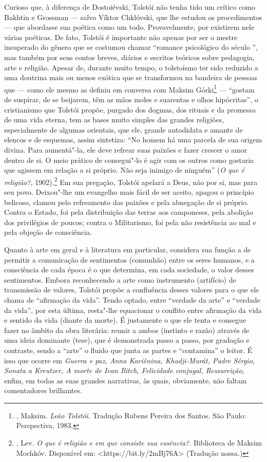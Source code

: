 Curioso que, à diferença de Dostoiévski, Tolstói não tenha tido
um crítico como Bakhtin e Grossman --- salvo Víktor Chklóvski,
que lhe estudou os procedimentos --- que abordasse sua poética
como um todo. Provavelmente, por existirem nele várias poéticas.
De fato, Tolstói é importante não apenas por ser o mestre
insuperado do gênero que se costumou chamar ``romance psicológico
do século '', mas também por seus contos breves,
diários e escritos teóricos sobre pedagogia, arte e religião.
Apesar de, durante muito tempo, o tolstoísmo ter sido reduzido
a uma doutrina mais ou menos exótica que se transformou na
bandeira de pessoas que --- como ele mesmo as definiu em conversa
com Maksim Górki\footnote{, Maksim. \emph{Leão
Tolstói}. Tradução Rubens Pereira dos Santos. São Paulo:
Perspectiva, 1983.} --- ``gostam de suspirar, de se beijarem,
têm as mãos moles e suarentas e olhos hipócritas'', o
cristianismo que Tolstói propõe, purgado dos dogmas, dos
rituais e da promessa de uma vida eterna, tem as bases muito
simples das grandes religiões, especialmente de algumas orientais,
que ele, grande autodidata e amante de elencos e de esquemas,
assim sintetiza: ``No homem há uma parcela de sua origem divina.
Para aumentá"-la, ele deve refrear suas paixões e fazer crescer o
amor dentro de si. O meio prático de consegui"-lo é agir com os
outros como gostaria que agissem em relação a si próprio. Não
seja inimigo de ninguém'' (\emph{O que é religião?},
1902).\footnote{, Lev. \emph{O que é religião e em que consiste sua essência?}. Biblioteca de Maksim Mochkóv.
Disponível em: \textless{}https://bit.ly/2mBj76A\textgreater{}
(Tradução nossa.)} Em sua pregação, Tolstói apelará a Deus, não por si, mas
para seu povo. Deixou"-lhe um evangelho mais fácil de ser aceito, apagou
o princípio belicoso, clamou pelo refreamento das paixões e pela
abnegação de si próprio. Contra o Estado, foi pela distribuição
das terras aos camponeses, pela abolição dos privilégios de
poucos; contra o Militarismo, foi pela não resistência ao mal e
pela objeção de consciência.

Quanto à arte em geral e à literatura em particular, considera sua
função a de permitir a comunicação de sentimentos (comunhão) entre
os seres humanos, e a consciência de cada época é o que determina,
em cada sociedade, o valor desses sentimentos. Embora reconhecendo
a arte como instrumento (artifício) de transmissão de valores,
Tolstói propõe a confluência desses valores para o que ele chama
de ``afirmação da vida''. Tendo optado, entre ``verdade da arte''
e ``verdade da vida'', por esta última, resta"-lhe equacionar o
conflito entre afirmação da vida e sentido da vida (diante da
morte). É justamente o que ele tenta e consegue fazer no âmbito
da obra literária: reunir a ambos (instinto e razão) através de
uma ideia dominante (tese), que é demonstrada passo a passo, por
gradação e contraste, sendo a ``arte'' o fluido que junta as
partes e ``contamina'' o leitor. É isso que ocorre em \emph{Guerra
e paz, Anna Kariênina, Khadji-Murát, Padre Sérgio, Sonata a
Kreutzer, A morte de Ivan Ilitch, Felicidade conjugal,
Ressureição}, enfim, em todas as suas grandes narrativas, às
quais, obviamente, não faltam comentadores brilhantes.

